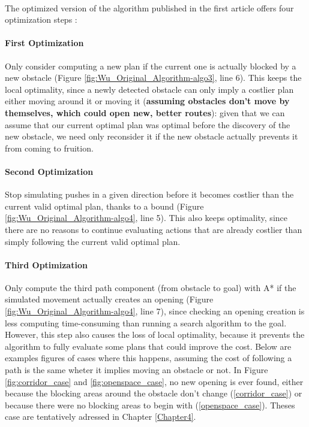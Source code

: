 \paragraph{} The optimized version of the algorithm published in the first article offers four optimization steps :

\paragraph{First Optimization}\label{optimization_1} Only consider computing a new plan if the current one is actually blocked by a new obstacle (Figure \ref{fig:Wu_Original_Algorithm-algo3}, line 6). This keeps the local optimality, since a newly detected obstacle can only imply a costlier plan either moving around it or moving it (\textbf{assuming obstacles don't move by themselves, which could open new, better routes}): given that we can assume that our current optimal plan was optimal before the discovery of the new obstacle, we need only reconsider it if the new obstacle actually prevents it from coming to fruition.

\paragraph{Second Optimization}\label{optimization_2} Stop simulating pushes in a given direction before it becomes costlier than the current valid optimal plan, thanks to a bound (Figure \ref{fig:Wu_Original_Algorithm-algo4}, line 5). This also keeps optimality, since there are no reasons to continue evaluating actions that are already costlier than simply following the current valid optimal plan.

\paragraph{Third Optimization}\label{optimization_3} Only compute the third path component (from obstacle to goal) with A* if the simulated movement actually creates an opening (Figure \ref{fig:Wu_Original_Algorithm-algo4}, line 7), since checking an opening creation is less computing time-consuming than running a search algorithm to the goal. However, this step also causes the loss of local optimality, because it prevents the algorithm to fully evaluate some plans that could improve the cost. Below are examples figures of cases where this happens, assuming the cost of following a path is the same wheter it implies moving an obstacle or not. In Figure \ref{fig:corridor_case} and \ref{fig:openspace_case}, no new opening is ever found, either because the blocking areas around the obstacle don't change (\ref{corridor_case}) or because there were no blocking areas to begin with (\ref{openspace_case}). Theses case are tentatively adressed in Chapter \ref{Chapter4}.

